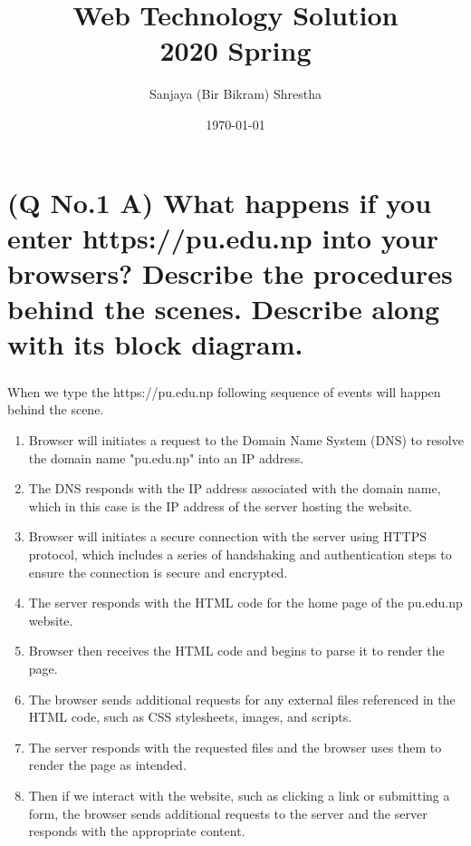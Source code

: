 \documentclass[11pt]{article}
\title{ Web Technology Solution\\2020 Spring}
\author{ Sanjaya (Bir Bikram) Shrestha }
\date{\today}
\begin{document}
\maketitle	
\pagestyle{fancy}

\tableofcontents
\pagebreak



\section{(Q No.1 A) What happens if you enter https://pu.edu.np into your browsers? Describe the procedures behind the scenes. Describe along with its block diagram.}
\subparagraph{}
When we type the https://pu.edu.np following sequence of events will happen behind the scene.

\begin{enumerate}
    \item Browser will initiates a request to the Domain Name System (DNS) to resolve the domain name "pu.edu.np" into an IP address.
    \item The DNS responds with the IP address associated with the domain name, which in this case is the IP address of the server hosting the website.
    \item Browser will initiates a secure connection with the server using HTTPS protocol, which includes a series of handshaking and authentication steps to ensure the connection is secure and encrypted.
    \item The server responds with the HTML code for the home page of the pu.edu.np website.
    \item Browser then receives the HTML code and begins to parse it to render the page.
    \item The browser sends additional requests for any external files referenced in the HTML code, such as CSS stylesheets, images, and scripts.
    \item The server responds with the requested files and the browser uses them to render the page as intended.
    \item Then if we interact with the website, such as clicking a link or submitting a form, the browser sends additional requests to the server and the server responds with the appropriate content.
\end{enumerate}
\end{document}
